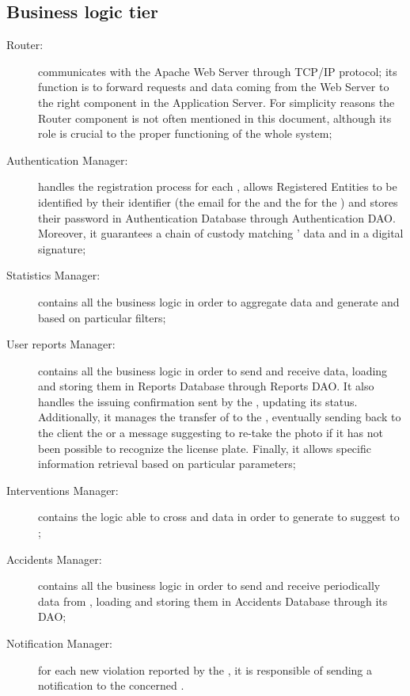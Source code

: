 \documentclass[../../DD.tex]{subfiles}
\begin{document}
\subsection{Business logic tier\label{sect:2.2.3}}
	\begin{description}
	\item[Router:] communicates with the Apache Web Server through TCP/IP protocol; its function is to forward requests and data coming from the Web Server to the right component in the Application Server. For simplicity reasons the Router component is not often mentioned in this document, although its role is crucial to the proper functioning of the whole system;
	 
	\item[Authentication Manager:] handles the registration process for each , allows Registered Entities to be identified by their identifier (the email for the  and the  for the ) and stores their password in Authentication Database through Authentication DAO. Moreover, it guarantees a chain of custody matching ' data and  in a digital signature;
	
	\item[Statistics Manager:] contains all the business logic in order to aggregate  data and generate  and   based on particular filters;
	
	\item[User reports Manager:] contains all the business logic in order to send and receive  data, loading and storing them in Reports Database through Reports DAO. It also handles the  issuing confirmation sent by the , updating its status. Additionally, it manages the transfer of  to the , eventually sending back to the client the  or a message suggesting to re-take the photo if it has not been possible to recognize the license plate. Finally, it allows specific  information retrieval based on particular parameters;
	
	\item[Interventions Manager:] contains the logic able to cross  and  data in order to generate  to suggest to ;
	
	\item[Accidents Manager:] contains all the business logic in order to send and receive periodically  data from , loading and storing them in Accidents Database through its DAO;
	
	\item[Notification Manager:] for each new violation reported by the , it is responsible of sending a notification to the concerned .
	\end{description}
\end{document}
